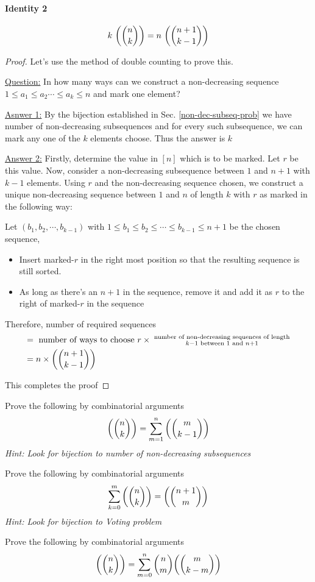 \paragraph{Identity 2}
$$k~\textrm{$\left(\binom{n}{k}\right)$}=n~\textrm{$\left(\binom{n+1}{k-1}\right)$}$$
\begin{proof}
Let's use the method of double counting to prove this.
\begin{description}
\item \underline{Question:} In how many ways can we construct a non-decreasing sequence $1\leq a_1\leq a_2\cdots\leq a_k\leq n$ and mark one element?
\item \underline{Asnwer 1:} By the bijection established in Sec. \ref{non-dec-subseq-prob} we have  number of non-decreasing subsequences and for every such subsequence, we can mark any one of the $k$ elements choose. Thus the answer is $k$  
\item \underline{Answer 2:} Firstly, determine the value in $[n]$ which is to be marked. Let $r$ be this value. Now, consider a non-decreasing subsequence between $1$ and $n+1$ with $k-1$ elements. Using $r$ and the non-decreasing sequence chosen, we construct a unique non-decreasing sequence between $1$ and $n$ of length $k$ with $r$ as marked in the following way:

Let $(b_1,b_2,\cdots,b_{k-1})$ with $1\leq b_1\leq b_2\leq\cdots\leq b_{k-1}\leq n+1$ be the chosen sequence, 
\begin{itemize}
    \item Insert marked-$r$ in the right most position so that the resulting sequence is still sorted.
    \item As long as there's an $n+1$ in the sequence, remove it and add it as $r$ to the right of marked-$r$ in the sequence
\end{itemize}
Therefore, number of required sequences 
\begin{align*}
    &= \textrm{ number of ways to choose }r \times \substack{\textrm{ number of non-decreasing sequences of length }\\ k-1 \textrm{ between } 1 \textrm{ and } n+1}\\
    &= n\times \textrm{$\left(\binom{n+1}{k-1}\right)$}
\end{align*}
\end{description}
This completes the proof
\end{proof}

\begin{ex}
    \item Prove the following by combinatorial arguments $$\textrm{$\left(\binom{n}{k}\right)$}=\sum\limits_{m=1}^{n}\textrm{$\left(\binom{m}{k-1}\right)$}$$ \emph{Hint: Look for bijection to number of non-decreasing subsequences}
    \item Prove the following by combinatorial arguments $$\sum\limits_{k=0}^{m}\textrm{$\left(\binom{n}{k}\right)$}=\textrm{$\left(\binom{n+1}{m}\right)$}$$ \emph{Hint: Look for bijection to Voting problem}
    \item Prove the following by combinatorial arguments $$\textrm{$\left(\binom{n}{k}\right)$}=\sum\limits_{m=0}^{n}\binom{n}{m}\textrm{$\left(\binom{m}{k-m}\right)$}$$
\end{ex}

